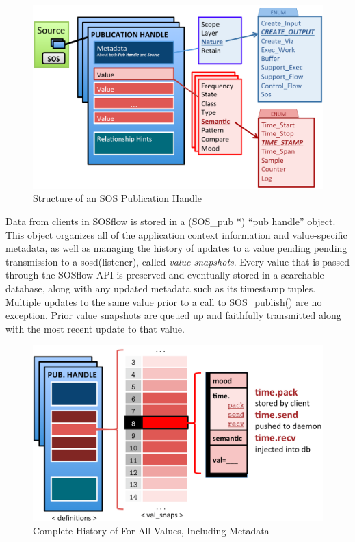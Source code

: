 \begin{figure}[!t]
\centering
\includegraphics[width=5in]{images/pub_handle.png}
\caption{Structure of an SOS Publication Handle}
\label{fig_sim}
\end{figure}

Data from clients in SOSflow is stored in a (SOS\_pub *) ``pub handle''
object.
%
This object organizes all of the application context information and
value-specific metadata, as well as managing the history of updates to
a value pending pending transmission to a sosd(listener), called
\textit{value snapshots}.
%
Every value that is passed through the SOSflow API is preserved and
eventually stored in a searchable database, along with any updated
metadata such as its timestamp tuples.
%
Multiple updates to the same value prior to a call to SOS\_publish()
are no exception.
%
Prior value snapshots are queued up and faithfully transmitted along
with the most recent update to that value.

\begin{figure}[!t]
\centering
\includegraphics[width=5in]{images/val_snaps.png}
\caption{Complete History of For All Values, Including Metadata}
\label{fig_sim}
\end{figure}


